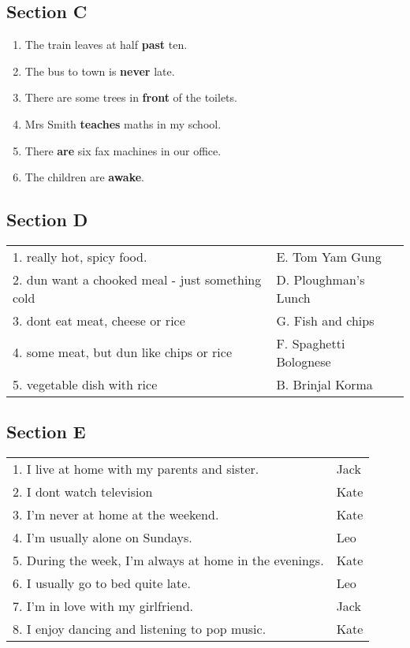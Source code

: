 \documentclass[11pt]{article}
\begin{document}
\subsection{Section C}
\label{sec:orgb9cee45}
\begin{enumerate}
\item The train leaves at half \textbf{past} ten.
\item The bus to town is \textbf{never} late.
\item There are some trees in \textbf{front} of the toilets.
\item Mrs Smith \textbf{teaches} maths in my school.
\item There \textbf{are} six fax machines in our office.
\item The children are \textbf{awake}.
\end{enumerate}

\subsection{Section D}
\label{sec:org08780aa}
\begin{center}
\begin{tabular}{ll}
\hline
1. really hot, spicy food. & E. Tom Yam Gung\\
2. dun want a chooked meal - just something cold & D. Ploughman's Lunch\\
3. dont eat meat, cheese or rice & G. Fish and chips\\
4. some meat, but dun like chips or rice & F. Spaghetti Bolognese\\
5. vegetable dish with rice & B. Brinjal Korma\\
\end{tabular}
\end{center}

\subsection{Section E}
\label{sec:org84bebb1}
\begin{center}
\begin{tabular}{ll}
\hline
1. I live at home with my parents and sister. & Jack\\
2. I dont watch television & Kate\\
3. I'm never at home at the weekend. & Kate\\
4. I'm usually alone on Sundays. & Leo\\
5. During the week, I'm always at home in the evenings. & Kate\\
6. I usually go to bed quite late. & Leo\\
7. I'm in love with my girlfriend. & Jack\\
8. I enjoy dancing and listening to pop music. & Kate\\
\end{tabular}
\end{center}
\end{document}
